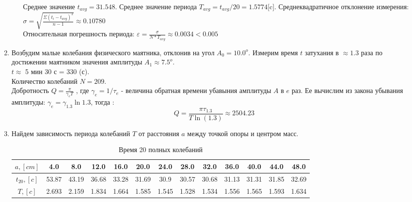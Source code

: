 \documentclass[12pt]{article}
\begin{document}
\begin{enumerate}
\begin{enumerate}
            Среднее значение $t_{avg} = 31.548$. Среднее значение периода $T_{avg} = t_{avg}/20 = 1.5774$[c].
            Среднеквадратичное отклонение измерения:
            $\sigma = \sqrt{\frac{\Sigma (t_i - t_{avg})^2 }{n-1}} \approx 0.10780$ \\
            Относительная погрешность периода: $\varepsilon = \frac{\sigma}{N* T_{avg}} \approx 0.0034 < 0.005$ \\  
        \end{enumerate}
        \item Возбудим малые колебания физического маятника, отклонив на угол $A_0 = 10.0^o$. Измерим время $t$ затухания в $\approx 1.3$ раза по достижении маятником значения амплитуды $A_1 \approx 7.5^o$. \\
        $t \approx$ 5 мин 30 с = 330 (с). \\
        Количество колебаний $N = 209$.\\
        Добротность $Q = \frac{\pi}{\gamma_{e}T}$ , где $\gamma_{e} = 1 / \tau_{e}$ - величина обратная времени убавыния амплитуды $A$ в $e$ раз. Ее вычислим из закона убывания амплитуды: $\gamma_{e} = \gamma_{1.3} \ln{1.3}$, тогда :\\
        \begin{equation}
            Q = \frac{\pi \tau_{1.3}}{T \ln(1.3)} \approx 2504.23
        \end{equation}
        \item Найдем зависимость периода колебаний $T$ от расстояния $a$ между точкой опоры и центром масс.
        \begin{table}[h]
                    \caption{Время 20 полных колебаний}
                    \begin{center}
                    \begin{tabular}{|c|c|c|c|c|c|c|c|c|c|c|c|c|}
                            \hline 
                                $a,[cm]$ & 4.0& 8.0& 12.0& 16.0& 20.0& 24.0& 28.0& 32.0& 36.0& 40.0& 44.0& 48.0 \\

                            \hline
                                $t_{20},[c]$ & 53.87& 43.19& 36.68& 33.28& 31.69& 30.9& 30.57& 30.68& 31.13& 31.31& 31.85& 32.69 \\
                            \hline
                                $T,[c]$ & 2.693& 2.159& 1.834& 1.664& 1.585& 1.545& 1.528& 1.534& 1.556& 1.565& 1.593& 1.634\\
                            \hline
                            \end{tabular}
                        \end{center}
            \end{table}


\end{enumerate}
\end{document}
